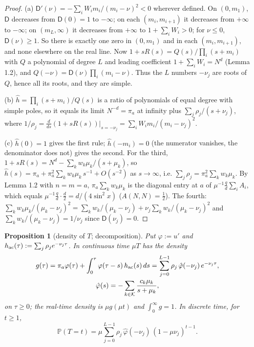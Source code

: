 \documentclass[11pt,a4paper]{article}
\newtheorem{proposition}[theorem]{Proposition}
\theoremstyle{definition}
\theoremstyle{remark}
\begin{document}
\begin{proof}
(a) $\mathsf D'(\nu)=-\sum_iW_im_i/(m_i-\nu)^2<0$ wherever defined. On $(0,m_1)$, $\mathsf D$ decreases from $\mathsf D(0)=1$ to $-\infty$; on each $(m_i,m_{i+1})$ it decreases from $+\infty$ to $-\infty$; on $(m_L,\infty)$ it decreases from $+\infty$ to $1+\sum_iW_i>0$; for $\nu\le0$, $\mathsf D(\nu)\ge1$. So there is exactly one zero in $(0,m_1)$ and in each $(m_i,m_{i+1})$, and none elsewhere on the real line. Now $1+sR(s)=Q(s)/\prod_i(s+m_i)$ with $Q$ a polynomial of degree $L$ and leading coefficient $1+\sum_iW_i=N^d$ (Lemma 1.2), and $Q(-\nu)=\mathsf D(\nu)\prod_i(m_i-\nu)$. Thus the $L$ numbers $-\nu_j$ are roots of $Q$, hence all its roots, and they are simple.

(b) $\hat h=\prod_i(s+m_i)/Q(s)$ is a ratio of polynomials of equal degree with simple poles, so it equals its limit $N^{-d}=\pi_a$ at infinity plus $\sum_j\rho_j/(s+\nu_j)$, where $1/\rho_j=\frac{d}{ds}(1+sR(s))|_{s=-\nu_j}=\sum_iW_im_i/(m_i-\nu_j)^2$.

(c) $\hat h(0)=1$ gives the first rule; $\hat h(-m_i)=0$ (the numerator vanishes, the denominator does not) gives the second. For the third, $1+sR(s)=N^d-\sum_kw_k\mu_k/(s+\mu_k)$, so $\hat h(s)=\pi_a+\pi_a^2\sum_kw_k\mu_k\,s^{-1}+O(s^{-2})$ as $s\to\infty$, i.e. $\sum_j\rho_j=\pi_a^2\sum_kw_k\mu_k$. By Lemma 1.2 with $n=m=a$, $\pi_a\sum_kw_k\mu_k$ is the diagonal entry at $a$ of $\mu^{-1}\frac qd\sum_iA_i$, which equals $\mu^{-1}\frac qd\cdot\frac d2=d/(4\sin^2x)$ ($A(N,N)=\frac12$). The fourth: $\sum_kw_k\mu_k/(\mu_k-\nu_j)^2=\sum_kw_k/(\mu_k-\nu_j)+\nu_j\sum_kw_k/(\mu_k-\nu_j)^2$ and $\sum_kw_k/(\mu_k-\nu_j)=1/\nu_j$ since $\mathsf D(\nu_j)=0$.
\end{proof}

\begin{proposition}[{density of $T$; decomposition}]
Put $\varphi:=u'$ and $h_{\rm ac}(\tau):=\sum_j\rho_je^{-\nu_j\tau}$. In continuous time $\mu T$ has the density
\begin{gather*}
g(\tau)=\pi_a\varphi(\tau)+\int_0^\tau\varphi(\tau-s)\,h_{\rm ac}(s)\,ds=\sum_{j=0}^{L-1}\rho_j\,\hat\varphi(-\nu_j)\,e^{-\nu_j\tau}, \\
\hat\varphi(s)=-\sum_{k\in\mathcal K}\frac{c_k\mu_k}{s+\mu_k},
\end{gather*}
on $\tau\ge0$; the real-time density is $\mu g(\mu t)$ and $\int_0^\infty g=1$. In discrete time, for $t\ge1$,
\begin{equation*}
\mathbb P(T=t)=\mu\sum_{j=0}^{L-1}\rho_j\,\hat\varphi(-\nu_j)\,(1-\mu\nu_j)^{t-1}.
\end{equation*}
\end{proposition}
\end{document}
